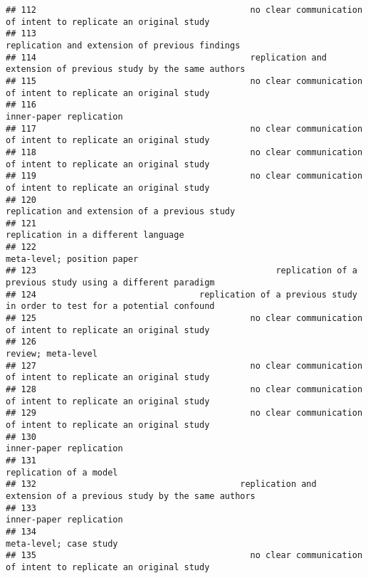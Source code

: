 \documentclass[
  english,
  man]{apa6}
\begin{document}
\begin{verbatim}
## 112                                          no clear communication of intent to replicate an original study
## 113                                                           replication and extension of previous findings
## 114                                          replication and extension of previous study by the same authors
## 115                                          no clear communication of intent to replicate an original study
## 116                                                                                  inner-paper replication
## 117                                          no clear communication of intent to replicate an original study
## 118                                          no clear communication of intent to replicate an original study
## 119                                          no clear communication of intent to replicate an original study
## 120                                                            replication and extension of a previous study
## 121                                                                      replication in a different language
## 122                                                                               meta-level; position paper
## 123                                               replication of a previous study using a different paradigm
## 124                                replication of a previous study in order to test for a potential confound
## 125                                          no clear communication of intent to replicate an original study
## 126                                                                                       review; meta-level
## 127                                          no clear communication of intent to replicate an original study
## 128                                          no clear communication of intent to replicate an original study
## 129                                          no clear communication of intent to replicate an original study
## 130                                                                                  inner-paper replication
## 131                                                                                   replication of a model
## 132                                        replication and extension of a previous study by the same authors
## 133                                                                                  inner-paper replication
## 134                                                                                   meta-level; case study
## 135                                          no clear communication of intent to replicate an original study

\end{verbatim}
\end{document}
